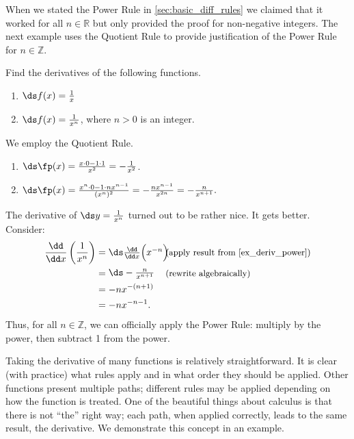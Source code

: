 When we stated the Power Rule in \autoref{sec:basic_diff_rules} we claimed that it worked for all $n\in\mathbb{R}$ but only provided the proof for non-negative integers. The next example uses the Quotient Rule to provide justification of the Power Rule for  $n\in\mathbb{Z}$.

\begin{example}\label{ex_deriv_power}
Find the derivatives of the following functions. 
\begin{enumerate}
	\item	$\ds f(x) = \frac{1}{x}$
	\item	$\ds f(x)= \frac{1}{x^n}$, where $n>0$ is an integer.
\end{enumerate}
\solution
We employ the Quotient Rule.
\begin{enumerate}
	\item	$\ds \fp(x) = \frac{x\cdot 0 - 1\cdot 1}{x^2} = -\frac{1}{x^2}$.
	\item	$\ds \fp(x) = \frac{x^n\cdot 0 - 1\cdot nx^{n-1}}{(x^n)^2} = -\frac{nx^{n-1}}{x^{2n}} = -\frac{n}{x^{n+1}}.$
\end{enumerate}
\end{example}

The derivative of $\ds y=\frac{1}{x^n}$ turned out to be rather nice. It gets better. Consider:
\begin{align*}
	\frac{\dd}{\dd x}\left(\frac{1}{x^n}\right)
	&= \parbox{60pt}{$\ds\frac{\dd}{\dd x}\Bigl(x^{-n}\Bigr)$}
	\text{\small (apply result from \autoref{ex_deriv_power})}\\
	&= \parbox{60pt}{$\ds-\frac{n}{x^{n+1}}$}\text{\small (rewrite algebraically)} \\
	&= -nx^{-(n+1)} \\
	&= -nx^{-n-1}.
\end{align*}
Thus, for all $n\in\mathbb{Z}$, we can officially apply the Power Rule: multiply by the power, then subtract 1 from the power.

Taking the derivative of many functions is relatively straightforward. It is clear (with practice) what rules apply and in what order they should be applied. Other functions present multiple paths; different rules may be applied depending on how the function is treated. One of the beautiful things about calculus is that there is not ``the'' right way; each path, when applied correctly, leads to the same result, the derivative. We demonstrate this concept in an example.

